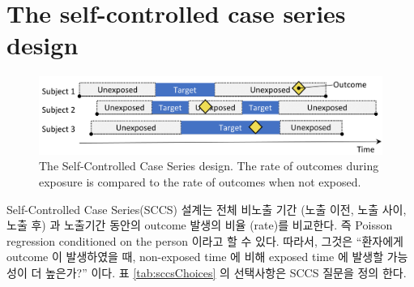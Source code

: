 \documentclass[]{book}
\begin{document}
\hypertarget{the-self-controlled-case-series-design}{%
\section{The self-controlled case series design}\label{the-self-controlled-case-series-design}}


\begin{figure}

{\centering \includegraphics[width=0.9\linewidth]{images/PopulationLevelEstimation/selfControlledCaseSeries} 

}

\caption{The Self-Controlled Case Series design. The rate of outcomes during exposure is compared to the rate of outcomes when not exposed.}\label{fig:selfControlledCaseSeries}
\end{figure}

Self-Controlled Case Series(SCCS) 설계\citep{farrington_1995, whitaker_2006}는 전체 비노출 기간 (노출 이전, 노출 사이, 노출 후) 과 노출기간 동안의 outcome 발생의 비율 (rate)를 비교한다. 즉 Poisson regression conditioned on the person 이라고 할 수 있다. 따라서, 그것은 ``환자에게 outcome 이 발생하였을 때, non-exposed time 에 비해 exposed time 에 발생할 가능성이 더 높은가?'' 이다. 표 \ref{tab:sccsChoices} 의 선택사항은 SCCS 질문을 정의 한다. 
\end{document}
